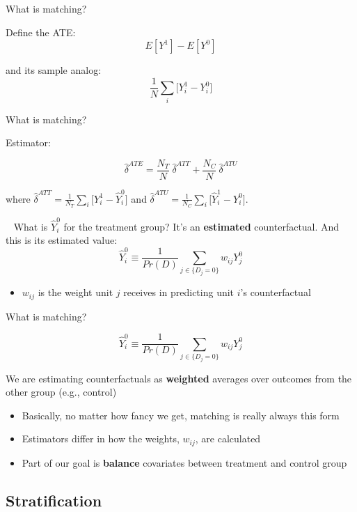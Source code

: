 \documentclass{beamer}
\begin{document}
\begin{frame}{What is matching?}

Define the ATE: $$E[Y^1] - E[Y^0]$$

and its sample analog: $$\frac{1}{N} \sum_i \bigg [ Y_i^1 - Y_i^0 \bigg ]$$


\end{frame}

\begin{frame}{What is matching?}

Estimator:

$$\widehat{\delta}^{ATE} = \frac{N_T}{N}\  \widehat{\delta}^{ATT} + \frac{N_C}{N}\  \widehat{\delta}^{ATU}$$


where $\widehat{\delta}^{ATT} = \frac{1}{N_T} \sum_i \bigg [Y_i^1 - \widehat{Y}_i^0 \bigg ]$ and $\widehat{\delta}^{ATU} = \frac{1}{N_C} \sum_i \bigg [\widehat{Y}_i^1 - Y_i^0 \bigg ]$.


\pause\bigskip~\bigskip
What is $\widehat{Y}^0_i$ for the treatment group?  It's an \textbf{estimated} counterfactual.  And this is its estimated value: 
$$\widehat{Y}^0_i \equiv \frac{1}{Pr(D)} \sum_{j \in \{D_j=0\}}w_{ij}Y_j^0$$

\begin{itemize}
  \item $w_{ij}$ is the weight unit $j$ receives in predicting unit $i$'s counterfactual
\end{itemize}

\end{frame}

\begin{frame}{What is matching?}

$$\widehat{Y}^0_i \equiv \frac{1}{Pr(D)} \sum_{j \in \{D_j=0\}}w_{ij}Y_j^0$$

\bigskip
We are estimating counterfactuals as \textbf{weighted} averages over outcomes from the other group (e.g., control)

\begin{itemize}
  \item Basically, no matter how fancy we get, matching is really always this form
  \item Estimators differ in how the weights, $w_{ij}$, are calculated
  \item Part of our goal is \textbf{balance} covariates between treatment and control group
\end{itemize}

\end{frame}

\subsection{Stratification}
\end{document}
